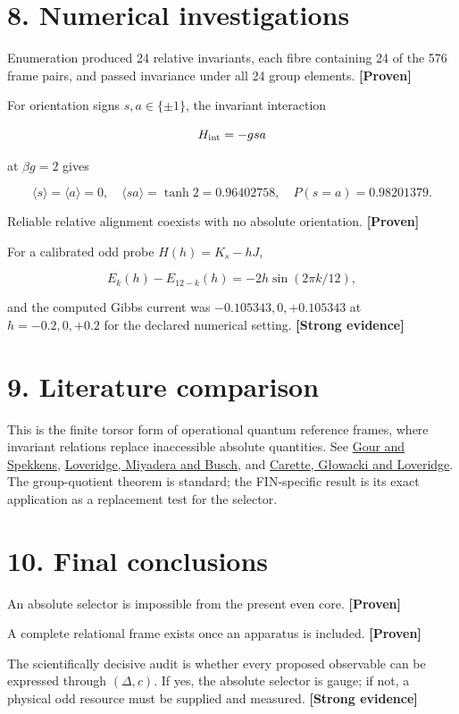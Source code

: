 \documentclass[11pt,a4paper,openany]{report}
\newcommand{\statusProven}{\textcolor{fingreen}{[Proven]}}
\newcommand{\statusStrong}{\textcolor{finblue}{[Strong evidence]}}
\begin{document}
\section{8. Numerical investigations}

Enumeration produced 24 relative invariants, each fibre containing 24 of the 576 frame pairs, and passed invariance under all 24 group elements. \textbf{\statusProven{}}

For orientation signs \(s,a\in\{\pm1\}\), the invariant interaction

\[
H_{\rm int}=-gsa
\]

at \(\beta g=2\) gives

\[
\langle s\rangle=\langle a\rangle=0,
\quad \langle sa\rangle=\tanh2=0.96402758,
\quad P(s=a)=0.98201379.
\]

Reliable relative alignment coexists with no absolute orientation. \textbf{\statusProven{}}

For a calibrated odd probe \(H(h)=K_s-hJ\),

\[
E_k(h)-E_{12-k}(h)=-2h\sin(2\pi k/12),
\]

and the computed Gibbs current was \(-0.105343,0,+0.105343\) at \(h=-0.2,0,+0.2\) for the declared numerical setting. \textbf{\statusStrong{}}

\section{9. Literature comparison}

This is the finite torsor form of operational quantum reference frames, where invariant relations replace inaccessible absolute quantities. See \href{https://arxiv.org/abs/0711.0043}{Gour and Spekkens}, \href{https://arxiv.org/abs/1703.10434}{Loveridge, Miyadera and Busch}, and \href{https://arxiv.org/abs/2303.14002}{Carette, Głowacki and Loveridge}. The group-quotient theorem is standard; the FIN-specific result is its exact application as a replacement test for the selector.

\section{10. Final conclusions}

An absolute selector is impossible from the present even core. \textbf{\statusProven{}}

A complete relational frame exists once an apparatus is included. \textbf{\statusProven{}}

The scientifically decisive audit is whether every proposed observable can be expressed through \((\Delta,c)\). If yes, the absolute selector is gauge; if not, a physical odd resource must be supplied and measured. \textbf{\statusStrong{}}
\end{document}
